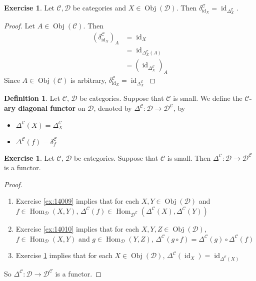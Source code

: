 \documentclass[12pt]{amsart}
\theoremstyle{definition}
\newtheorem{defn}[definition]{Definition}
\newtheorem{ex}[definition]{Exercise}
\newcommand{\del}{\delta}
\newcommand{\Del}{\Delta}
\newcommand{\MC}{\mathcal{C}}
\newcommand{\MD}{\mathcal{D}}
\DeclareMathOperator{\id}{id}
\DeclareMathOperator{\Obj}{Obj}
\DeclareMathOperator{\Hom}{Hom}
\DeclareMathOperator*{\0}{\mbf{0}}
\DeclareMathOperator*{\1}{\mbf{1}}
\newcommand{\lex}[1]{\label{ex:#1}}
\newcommand{\ld}[1]{\label{defn:#1}}
\newcommand{\rex}[1]{Exercise \ref{ex:#1}}
\begin{document}
	\begin{ex} \lex{14011}
		Let $\MC, \MD$ be categories and $X \in \Obj(\MD)$. Then $\del^{\MC}_{\id_X} = \id_{\Del^{\MC}_X}$.
	\end{ex}

	\begin{proof}
		Let $A \in \Obj(\MC)$. Then 
		\begin{align*}
			(\del^{\MC}_{\id_X})_A
			& = \id_X \\
			& = \id_{\Del^{\MC}_X(A)} \\
			& = (\id_{\Del^{\MC}_X})_A 
		\end{align*}
		Since $A \in \Obj(\MC)$ is arbitrary, $\del^{\MC}_{\id_X} = \id_{\Del^{\MC}_X}$
	\end{proof}

	\begin{defn} \ld{14011}
		Let $\MC$, $\MD$ be categories. Suppose that $\MC$ is small. We define the \textbf{$\MC$-ary diagonal functor} on $\MD$, denoted by $\Del^{\MC}: \MD \rightarrow \MD^{\MC}$, by
		\begin{itemize}
			\item $\Del^{\MC}(X) = \Del^{\MC}_X$
			\item $\Del^{\MC}(f) = \del^{\MC}_f$
		\end{itemize}
	\end{defn}

	\begin{ex} \lex{14012}
		Let $\MC$, $\MD$ be categories. Suppose that $\MC$ is small. Then $\Del^{\MC}: \MD \rightarrow \MD^{\MC}$ is a functor.
	\end{ex}

	\begin{proof}\
		\begin{enumerate}
			\item \rex{14009} implies that for each $X, Y \in \Obj(\MD)$ and $f \in \Hom_{\MD}(X, Y)$, $\Del^{\MC}(f) \in \Hom_{\MD^{\MC}} (\Del^{\MC}(X), \Del^{\MC}(Y))$
			\item \rex{14010} implies that for each $X, Y, Z \in \Obj(\MD)$, $f \in \Hom_{\MD}(X, Y)$ and $g \in \Hom_{\MD}(Y, Z)$, $\Del^{\MC}(g \circ f) = \Del^{\MC}(g) \circ \Del^{\MC}(f)$
			\item \rex{14011} implies that for each $X \in \Obj(\MD)$, $\Del^{\MC}(\id_X) = \id_{\Del^{\MC}(X)}$
		\end{enumerate}
		 So $\Del^{\MC} : \MD \rightarrow \MD^{\MC}$ is a functor.
	\end{proof}
\end{document}

